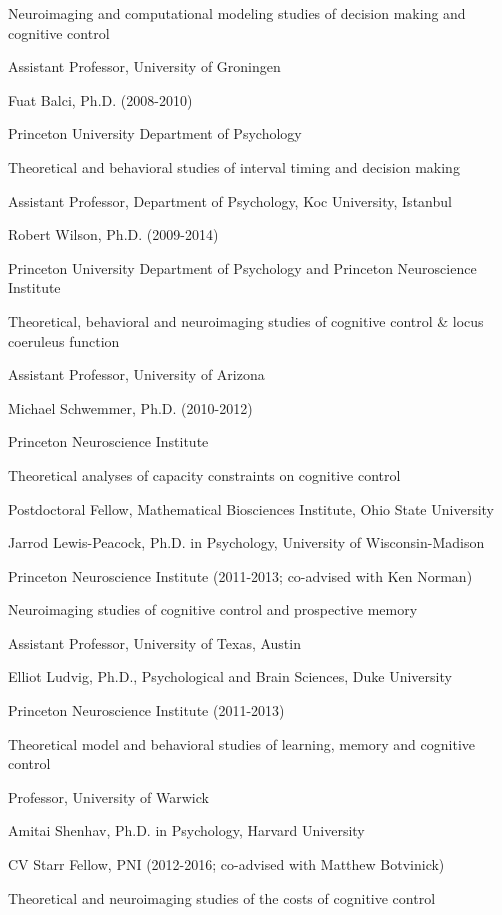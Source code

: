 \documentclass[10 pt]{article}
\begin{document}
Neuroimaging and computational modeling studies of decision making and cognitive control

Assistant Professor, University of Groningen
    \medskip

Fuat Balci, Ph.D. (2008-2010)

Princeton University Department of Psychology

Theoretical and behavioral studies of interval timing and decision making

Assistant Professor, Department of Psychology, Koc University, Istanbul
    \medskip

Robert Wilson, Ph.D. (2009-2014)

Princeton University Department of Psychology and Princeton Neuroscience Institute

Theoretical, behavioral and neuroimaging studies of cognitive control \& locus coeruleus function

Assistant Professor, University of Arizona
    \medskip

Michael Schwemmer, Ph.D. (2010-2012)

Princeton Neuroscience Institute

Theoretical analyses of capacity constraints on cognitive control

Postdoctoral Fellow, Mathematical Biosciences Institute, Ohio State University
    \medskip

Jarrod Lewis-Peacock, Ph.D. in Psychology, University of Wisconsin-Madison

Princeton Neuroscience Institute (2011-2013; co-advised with Ken Norman)

Neuroimaging studies of cognitive control and prospective memory

Assistant Professor, University of Texas, Austin
    \medskip

Elliot Ludvig, Ph.D., Psychological and Brain Sciences, Duke University

Princeton Neuroscience Institute (2011-2013)

Theoretical model and behavioral studies of learning, memory and cognitive control

Professor, University of Warwick
    \medskip

Amitai Shenhav, Ph.D. in Psychology, Harvard University

CV Starr Fellow, PNI (2012-2016; co-advised with Matthew Botvinick)

Theoretical and neuroimaging studies of the costs of cognitive control
\end{document}
